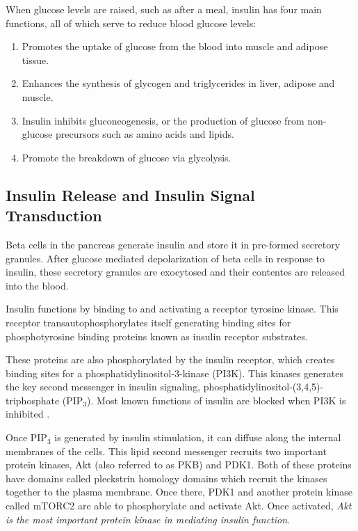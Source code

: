 \documentclass{tufte-handout}
\begin{document}
When glucose levels are raised, such as after a meal, insulin has four main functions, all of which serve to reduce blood glucose levels:

\begin{enumerate}
\item Promotes the uptake of glucose from the blood into muscle and adipose tissue.  
\item Enhances the synthesis of glycogen and triglycerides in liver, adipose and muscle.  
\item Insulin inhibits gluconeogenesis, or the production of glucose from non-glucose precursors such as amino acids and lipids.
\item Promote the breakdown of glucose via glycolysis.
\end{enumerate}

\subsection{Insulin Release and Insulin Signal Transduction}

Beta cells in the pancreas generate insulin and store it in pre-formed secretory granules.  After glucose mediated depolarization of beta cells in response to insulin, these secretory granules are exocytosed and their contentes are released into the blood.

Insulin functions by binding to and activating a receptor tyrosine kinase.  This receptor transautophosphorylates itself generating binding sites for phosphotyrosine binding proteins known as insulin receptor substrates.

These proteins are also phosphorylated by the insulin receptor, which creates binding sites for a phosphatidylinositol-3-kinase (PI3K).  This kinases generates the key second messenger in insulin signaling, phosphatidylinositol-(3,4,5)-triphosphate (PIP$_3$).  Most known functions of insulin are blocked when PI3K is inhibited \cite{Kanai1993}.

Once PIP$_3$ is generated by insulin stimulation, it can diffuse along the internal membranes of the cells.  This lipid second messenger recruits two important protein kinases, Akt (also referred to as PKB) and PDK1.  Both of these proteins have domains called pleckstrin homology domains which recruit the kinases together to the plasma membrane.  Once there, PDK1 and another protein kinase called mTORC2 are able to phosphorylate and activate Akt.  Once activated, \emph{Akt is the most important protein kinase in mediating insulin function}.
\end{document}
